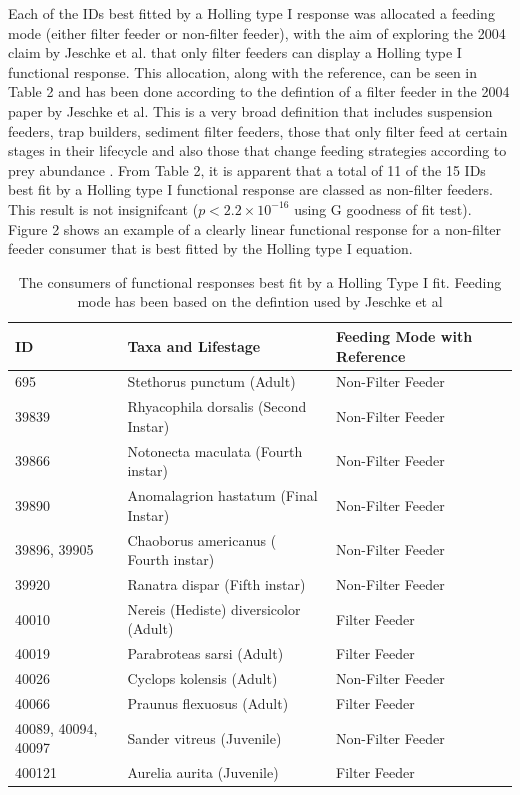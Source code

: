 \documentclass[11pt, a4paper, titlepage]{article}
\begin{document}
Each of the IDs best fitted by a Holling type I response was allocated a feeding mode (either filter feeder or non-filter feeder), with the aim of exploring the 2004 claim by Jeschke et al.\parencite{Jeschke2004} that only filter feeders can display a Holling type I functional response. This allocation, along with the reference, can be seen in Table 2 and has been done according to the defintion of a filter feeder in the 2004 paper by Jeschke et al. This is a very broad definition that includes suspension feeders, trap builders, sediment filter feeders, those that only filter feed at certain stages in their lifecycle and also those that change feeding strategies according to prey abundance \parencite{Jeschke2004}.
From Table 2, it is apparent that a total of 11 of the 15 IDs best fit by a Holling type I functional response are classed as non-filter feeders.
This result is not insignifcant ($p < 2.2\times10^{-16}$ using G goodness of fit test). Figure 2 shows an example of a clearly linear functional response for a non-filter feeder consumer that is best fitted by the Holling type I equation.

\begin{table}[h!]
	\small
	\begin{tabular} {| l | l | l |}  \hline
		\textbf{ID} & \textbf{Taxa and Lifestage} & \textbf{Feeding Mode with Reference} \\ \hline
		695 & Stethorus punctum (Adult) & Non-Filter Feeder \parencite{Stethorus}  \\ \hline
		39839 & Rhyacophila dorsalis (Second Instar) &  Non-Filter Feeder \parencite{Rhyacophila}  \\ \hline
		39866 & Notonecta maculata (Fourth instar) & Non-Filter Feeder \parencite{Notonecta}  \\ \hline
		39890 & Anomalagrion hastatum  (Final Instar) &  Non-Filter Feeder \parencite{Anomalagrion}  \\ \hline
		39896, 39905 & Chaoborus americanus ( Fourth instar) & Non-Filter Feeder  \parencite{Chaoborus}  \\ \hline
		39920 & Ranatra dispar (Fifth instar)  &  Non-Filter Feeder \parencite{Ranatra}  \\ \hline
		40010 & Nereis (Hediste) diversicolor (Adult) & Filter Feeder \parencite{Nereis}  \\ \hline
		40019 & Parabroteas sarsi (Adult) & Filter Feeder \parencite{Copepod}  \\ \hline
		40026 &  Cyclops kolensis (Adult) & Non-Filter Feeder \parencite{Cyclops}  \\ \hline
		40066 & Praunus flexuosus (Adult) & Filter Feeder \parencite{Praunus}  \\ \hline
		40089, 40094, 40097 & Sander vitreus (Juvenile) &  Non-Filter Feeder \parencite{Sander}  \\ \hline
		400121 & Aurelia aurita (Juvenile) & Filter Feeder \parencite{Aurelia} \\ \hline
	\end{tabular}
	\caption{The consumers of functional responses best fit by a Holling Type I fit. Feeding mode has been based on the defintion used by Jeschke et al \parencite{Jeschke2004}}
\end{table}
\end{document}
